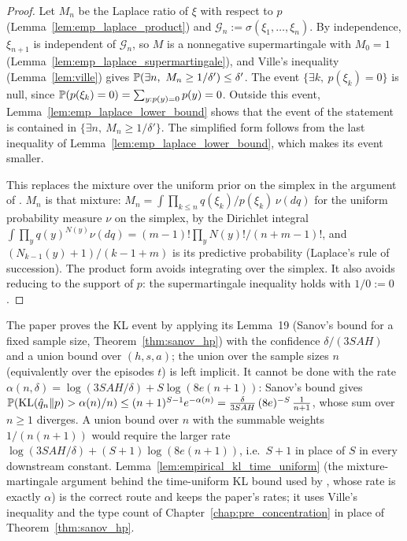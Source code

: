 \begin{proof}
\leanok
{}
Let $M_n$ be the Laplace ratio of $\xi$ with respect to $p$ (Lemma~\ref{lem:emp_laplace_product})
and $\mathcal G_n := \sigma(\xi_1, \dots, \xi_n)$. By independence, $\xi_{n+1}$ is independent of
$\mathcal G_n$, so $M$ is a nonnegative supermartingale with $M_0 = 1$
(Lemma~\ref{lem:emp_laplace_supermartingale}), and Ville's inequality (Lemma~\ref{lem:ville})
gives $\mathbb{P}(\exists n,\ M_n \ge 1/\delta') \le \delta'$. The event
$\{\exists k,\ p(\xi_k) = 0\}$ is null, since $\mathbb{P}(p(\xi_k) = 0) = \sum_{y : p(y) = 0} p(y) = 0$.
Outside this event, Lemma~\ref{lem:emp_laplace_lower_bound} shows that the event of the statement
is contained in $\{\exists n,\ M_n \ge 1/\delta'\}$. The simplified form follows from the last
inequality of Lemma~\ref{lem:emp_laplace_lower_bound}, which makes its event smaller.

This replaces the mixture over the uniform prior on the simplex in the argument of
\cite{menard2021fast}. $M_n$ is that mixture:
$M_n = \int \prod_{k \le n} q(\xi_k)/p(\xi_k)\, \nu(dq)$ for the uniform probability measure $\nu$
on the simplex, by the Dirichlet integral
$\int \prod_y q(y)^{N(y)} \nu(dq) = (m - 1)! \prod_y N(y)!/(n + m - 1)!$, and
$(N_{k-1}(y) + 1)/(k - 1 + m)$ is its predictive probability (Laplace's rule of succession).
The product form avoids integrating over the simplex. It also avoids reducing to the support of
$p$: the supermartingale inequality holds with $1/0 := 0$.
\end{proof}

\begin{remark}\label{rem:empirical_sanov_union}
The paper proves the KL event by applying its Lemma~19 (Sanov's bound for a fixed sample size,
Theorem~\ref{thm:sanov_hp}) with the confidence $\delta/(3SAH)$ and a union bound over
$(h, s, a)$; the union over the sample sizes $n$ (equivalently over the episodes $t$) is left
implicit. It cannot be done with the rate $\alpha(n, \delta) = \log(3SAH/\delta) + S \log(8e(n + 1))$:
Sanov's bound gives $\mathbb{P}(\mathrm{KL}(\hat q_n \| p) > \alpha(n)/n) \le (n + 1)^{S - 1} e^{-\alpha(n)} = \frac{\delta}{3SAH}\,(8e)^{-S}\,\frac{1}{n + 1}$,
whose sum over $n \ge 1$ diverges. A union bound over $n$ with the summable weights
$1/(n(n + 1))$ would require the larger rate $\log(3SAH/\delta) + (S + 1)\log(8e(n + 1))$, i.e.\
$S + 1$ in place of $S$ in every downstream constant. Lemma~\ref{lem:empirical_kl_time_uniform}
(the mixture-martingale argument behind the time-uniform KL bound used by
\cite{menard2021fast}, whose rate is exactly $\alpha$) is the correct route and keeps the paper's
rates; it uses Ville's inequality and the type count of Chapter~\ref{chap:pre_concentration}
in place of Theorem~\ref{thm:sanov_hp}.
\end{remark}

